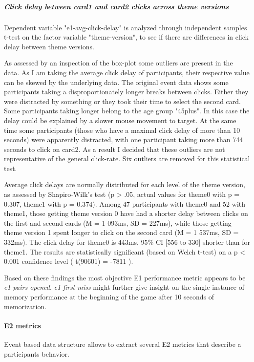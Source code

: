 	\subparagraph{Click delay between card1 and card2 clicks across theme versions} Dependent variable "e1-avg-click-delay" is analyzed through independent samples t-test on the factor variable "theme-version", to see if there are differences in click delay between theme versions.
	
	As assessed by an inspection of the box-plot some outliers are present in the data. As I am taking the average click delay of participants, their respective value can be skewed by the underlying data. The original event data shows some participants taking a disproportionately longer breaks between clicks. Either they were distracted by something or they took their time to select the second card. Some participants taking longer belong to the age group "45plus". In this case the delay could be explained by a slower mouse movement to target. At the same time some participants (those who have a maximal click delay of more than 10 seconds) were apparently distracted, with one participant taking more than 744 seconds to click on card2. As a result I decided that these outliers are not representative of the general click-rate. Six outliers are removed for this statistical test.
	
	Average click delays are normally distributed for each level of the theme version, as assessed by Shapiro-Wilk's test (p > .05, actual values for theme0 with p = 0.307, theme1 with p = 0.374). Among 47 participants with theme0 and 52 with theme1, those getting theme version 0 have had a shorter delay between clicks on the first and second cards (M = 1 093ms, SD = 227ms), while those getting theme version 1 spent longer to click on the second card (M = 1 537ms, SD = 332ms). The click delay for theme0 is 443ms, 95\% CI [556 to 330] shorter than for theme1. The results are statistically significant (based on Welch t-test) on a p < 0.001 confidence level ( t(90601) = -7811 ).
	
	Based on these findings the most objective E1 performance metric appears to be \textit{e1-pairs-opened}.
	\textit{e1-first-miss} might further give insight on the single instance of memory performance at the beginning of the game after 10 seconds of memorization.
	
	\paragraph{E2 metrics} 
	Event based data structure allows to extract several E2 metrics that describe a participants behavior.
	
